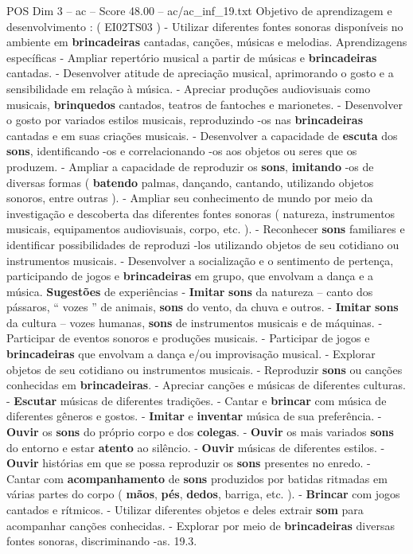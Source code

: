 \begin{textsample}{POS Dim 3 – ac – Score 48.00 – ac/ac\_inf\_19.txt}
Objetivo de aprendizagem e desenvolvimento : ( EI02TS03 ) - Utilizar diferentes fontes sonoras disponíveis no ambiente em \textbf{brincadeiras} cantadas, canções, músicas e melodias.
Aprendizagens específicas - Ampliar repertório musical a partir de músicas e \textbf{brincadeiras} cantadas. - Desenvolver atitude de apreciação musical, aprimorando o gosto e a sensibilidade em relação à música. - Apreciar produções audiovisuais como musicais, \textbf{brinquedos} cantados, teatros de fantoches e marionetes. - Desenvolver o gosto por variados estilos musicais, reproduzindo -os nas \textbf{brincadeiras} cantadas e em suas criações musicais. - Desenvolver a capacidade de \textbf{escuta} dos \textbf{sons}, identificando -os e correlacionando -os aos objetos ou seres que os produzem. - Ampliar a capacidade de reproduzir os \textbf{sons}, \textbf{imitando} -os de diversas formas ( \textbf{batendo} palmas, dançando, cantando, utilizando objetos sonoros, entre outras ). - Ampliar seu conhecimento de mundo por meio da investigação e descoberta das diferentes fontes sonoras ( natureza, instrumentos musicais, equipamentos audiovisuais, corpo, etc. ). - Reconhecer \textbf{sons} familiares e identificar possibilidades de reproduzi -los utilizando objetos de seu cotidiano ou instrumentos musicais. - Desenvolver a socialização e o sentimento de pertença, participando de jogos e \textbf{brincadeiras} em grupo, que envolvam a dança e a música. \textbf{Sugestões} de experiências - \textbf{Imitar} \textbf{sons} da natureza – canto dos pássaros, “ vozes ” de animais, \textbf{sons} do vento, da chuva e outros. - \textbf{Imitar} \textbf{sons} da cultura – vozes humanas, \textbf{sons} de instrumentos musicais e de máquinas. - Participar de eventos sonoros e produções musicais. - Participar de jogos e \textbf{brincadeiras} que envolvam a dança e/ou improvisação musical. - Explorar objetos de seu cotidiano ou instrumentos musicais. - Reproduzir \textbf{sons} ou canções conhecidas em \textbf{brincadeiras}. - Apreciar canções e músicas de diferentes culturas. - \textbf{Escutar} músicas de diferentes tradições. - Cantar e \textbf{brincar} com música de diferentes gêneros e gostos. - \textbf{Imitar} e \textbf{inventar} música de sua preferência. - \textbf{Ouvir} os \textbf{sons} do próprio corpo e dos \textbf{colegas}. - \textbf{Ouvir} os mais variados \textbf{sons} do entorno e estar \textbf{atento} ao silêncio. - \textbf{Ouvir} músicas de diferentes estilos. - \textbf{Ouvir} histórias em que se possa reproduzir os \textbf{sons} presentes no enredo. - Cantar com \textbf{acompanhamento} de \textbf{sons} produzidos por batidas ritmadas em várias partes do corpo ( \textbf{mãos}, \textbf{pés}, \textbf{dedos}, barriga, etc. ). - \textbf{Brincar} com jogos cantados e rítmicos. - Utilizar diferentes objetos e deles extrair \textbf{som} para acompanhar canções conhecidas. - Explorar por meio de \textbf{brincadeiras} diversas fontes sonoras, discriminando -as. 19.3.

\end{textsample}
